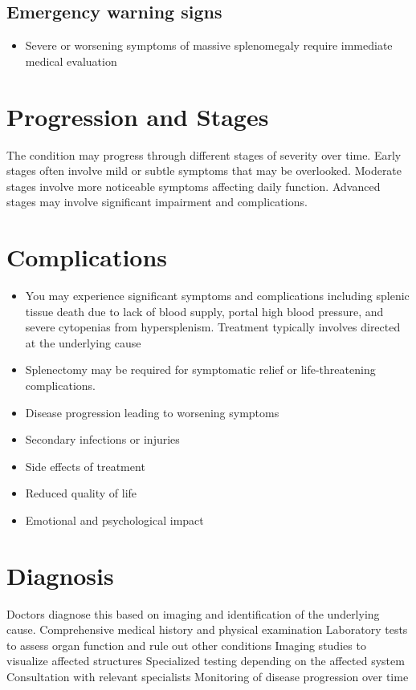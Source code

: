 \subsection{Emergency warning signs}
\begin{itemize}[noitemsep]
  \item Severe or worsening symptoms of massive splenomegaly require immediate medical evaluation
\end{itemize}
\section{Progression and Stages}
The condition may progress through different stages of severity over time. Early stages often involve mild or subtle symptoms that may be overlooked. Moderate stages involve more noticeable symptoms affecting daily function. Advanced stages may involve significant impairment and complications.
\section{Complications}
\begin{itemize}[noitemsep]
  \item You may experience significant symptoms and complications including splenic tissue death due to lack of blood supply, portal high blood pressure, and severe cytopenias from hypersplenism. Treatment typically involves directed at the underlying cause
  \item Splenectomy may be required for symptomatic relief or life-threatening complications.
  \item Disease progression leading to worsening symptoms
  \item Secondary infections or injuries
  \item Side effects of treatment
  \item Reduced quality of life
  \item Emotional and psychological impact
\end{itemize}
\section{Diagnosis}
Doctors diagnose this based on imaging and identification of the underlying cause. Comprehensive medical history and physical examination Laboratory tests to assess organ function and rule out other conditions Imaging studies to visualize affected structures Specialized testing depending on the affected system Consultation with relevant specialists Monitoring of disease progression over time


